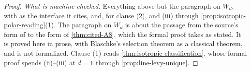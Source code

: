 \begin{proof}
\emph{What is machine-checked.} Everything above but the paragraph on $W_d$, with  as
the interface it cites, and,
for clause (2),  and (iii) through \ref{prop:isotropic-polar-reading}(1). The
paragraph on $W_d$ is about the passage from the source's form of  to the form of
\ref{thm:cited-A8}, which the formal proof takes as stated. It is proved here in prose, with
Blaschke's selection theorem as a classical theorem, and is not formalized.
Clause (1) reads \ref{thm:isotropic-classification}, whose formal proof spends (ii)--(iii)
at $d = 1$ through \ref{prop:line-levy-unique}.
\end{proof}

